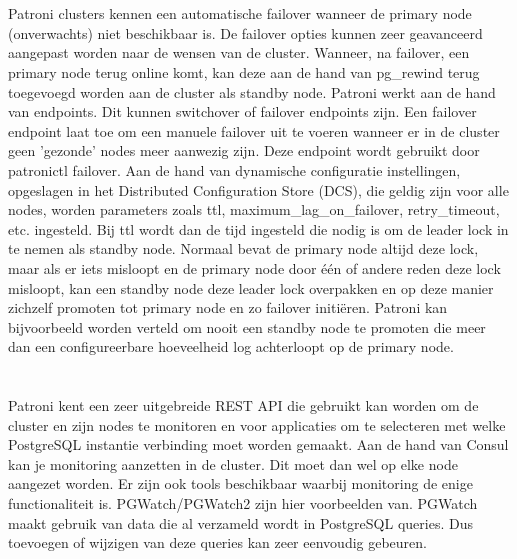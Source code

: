 

\section{}
\label{sec:Failover}

Patroni clusters kennen een automatische failover wanneer de primary node (onverwachts) niet beschikbaar is. De failover opties kunnen zeer geavanceerd aangepast worden naar de wensen van de cluster. Wanneer, na failover, een primary node terug online komt, kan deze aan de hand van pg\_rewind terug toegevoegd worden aan de cluster als standby node. Patroni werkt aan de hand van endpoints. Dit kunnen switchover of failover endpoints zijn. Een failover endpoint laat toe om een manuele failover uit te voeren wanneer er in de cluster geen 'gezonde' nodes meer aanwezig zijn. Deze endpoint wordt gebruikt door patronictl failover.
Aan de hand van dynamische configuratie instellingen, opgeslagen in het Distributed Configuration Store (DCS), die geldig zijn voor alle nodes, worden parameters zoals ttl, maximum\_lag\_on\_failover, retry\_timeout, etc. ingesteld. Bij ttl wordt dan de tijd ingesteld die nodig is om de leader lock in te nemen als standby node. Normaal bevat de primary node altijd deze lock, maar als er iets misloopt en de primary node door één of andere reden deze lock misloopt, kan een standby node deze leader lock overpakken en op deze manier zichzelf promoten tot primary node en zo failover initiëren. Patroni kan bijvoorbeeld worden verteld om nooit een standby node te promoten die meer dan een configureerbare hoeveelheid log achterloopt op de primary node.



\section{}
\label{sec:Monitoring}

Patroni kent een zeer uitgebreide REST API die gebruikt kan worden om de cluster en zijn nodes te monitoren en voor applicaties om te selecteren met welke PostgreSQL instantie verbinding moet worden gemaakt. Aan de hand van Consul kan je monitoring aanzetten in de cluster. Dit moet dan wel op elke node aangezet worden.
Er zijn ook tools beschikbaar waarbij monitoring de enige functionaliteit is. PGWatch/PGWatch2 zijn hier voorbeelden van. PGWatch maakt gebruik van data die al verzameld wordt in PostgreSQL queries. Dus toevoegen of wijzigen van deze queries kan zeer eenvoudig gebeuren.





